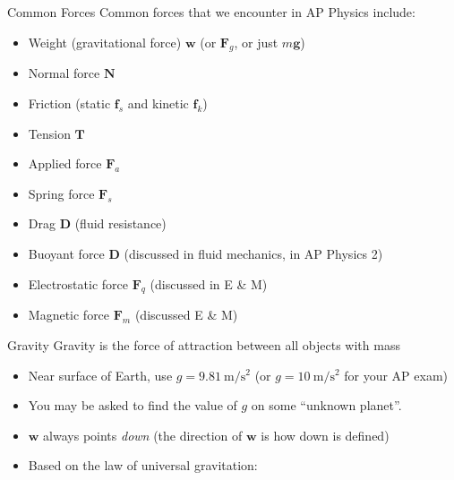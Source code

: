 \documentclass[12pt,compress,aspectratio=169]{beamer}
\begin{document}
\begin{frame}{Common Forces}
  Common forces that we encounter in AP Physics include:
  \begin{itemize}
  \item Weight (gravitational force) $\bm w$ (or $\bm F_g$, or just $m\bm g$)
  \item Normal force $\bm N$
  \item Friction (static $\bm f_s$ and kinetic $\bm f_k$)
  \item Tension $\bm T$
  \item Applied force $\bm F_a$
  \item Spring force $\bm F_s$
  \item Drag $\bm D$ (fluid resistance)
  \item Buoyant force $\bm D$ (discussed in fluid mechanics, in AP Physics 2)
  \item Electrostatic force $\bm F_q$ (discussed in E \& M)
  \item Magnetic force $\bm F_m$ (discussed E \& M)
  \end{itemize}
\end{frame}



\begin{frame}{Gravity}
  Gravity is the force of attraction between all objects with mass
    
  \begin{itemize}
  \item\vspace{-.15in}Near surface of Earth, use
    $g=\SI{9.81}{\metre\per\second\squared}$ (or
    $g=\SI{10}{\metre\per\second\squared}$ for your AP exam)
  \item You may be asked to find the value of $g$ on some ``unknown planet''.
  \item $\bm w$ always points \emph{down} (the direction of $\bm w$ is how
    down is defined)
  \item Based on the law of universal gravitation:

  \end{itemize}    
\end{frame}
\end{document}
